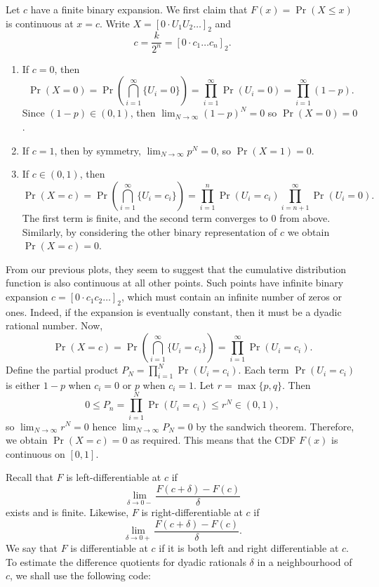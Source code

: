 \documentclass{article}
\begin{document}
Let \(c\) have a finite binary expansion. We first claim that \(F(x) = \Pr(X \leq x)\) is continuous at \(x = c\). Write \(X = [0 \cdot U_1 U_2\dots]_2\) and
\[ c = \frac{k}{2^n} = [0 \cdot c_1 \dots c_n]_2. \]
\begin{enumerate}
    \item If \(c = 0\), then 
    \[ \Pr(X = 0) = \Pr\left(\bigcap_{i=1}^\infty\{U_i = 0\}\right) = \prod_{i=1}^\infty \Pr(U_i = 0) = \prod_{i=1}^\infty (1 - p). \]
    Since \((1 - p) \in (0, 1)\), then \(\lim_{N \to \infty} (1 - p)^N = 0\) so \(\Pr(X = 0) = 0\).
    \item If \(c = 1\), then by symmetry, \(\lim_{N \to \infty} p^N = 0\), so \(\Pr(X = 1) = 0\).
    \item If \(c \in (0,1)\), then
    \[ \Pr(X = c) = \Pr\left(\bigcap_{i=1}^\infty\{U_i = c_i\}\right) = \prod_{i=1}^n \Pr(U_i = c_i)\prod_{i=n+1}^\infty \Pr(U_i = 0). \]
    The first term is finite, and the second term converges to \(0\) from above. Similarly, by considering the other binary representation of \(c\) we obtain \(\Pr(X = c) = 0\).
\end{enumerate}

From our previous plots, they seem to suggest that the cumulative distribution function is also continuous at all other points. Such points have infinite binary expansion \(c = [0 \cdot c_1c_2\dots]_2\), which must contain an infinite number of zeros or ones. Indeed, if the expansion is eventually constant, then it must be a dyadic rational number. Now,
\[ \Pr(X = c) = \Pr\left(\bigcap_{i=1}^\infty\{U_i = c_i\}\right) = \prod_{i=1}^\infty \Pr(U_i = c_i). \]
Define the partial product \(P_N = \prod_{i=1}^N \Pr(U_i = c_i) \). Each term \(\Pr(U_i = c_i)\) is either \(1 - p\) when \(c_i = 0\) or \(p\) when \(c_i = 1\). Let \(r = \max\{p,q\}\). Then
\[ 0 \leq P_n = \prod_{i=1}^N \Pr(U_i = c_i) \leq r^N \in (0,1), \]
so \(\lim_{N \to \infty} r^N = 0\) hence \(\lim_{N \to \infty} P_N = 0\) by the sandwich theorem. Therefore, we obtain \(\Pr(X = c) = 0\) as required. This means that the CDF \(F(x)\) is continuous on \([0,1]\).

Recall that \(F\) is left-differentiable at \(c\) if
\[ \lim_{\delta \to 0-} \frac{F(c + \delta) - F(c)}{\delta} \]
exists and is finite. Likewise, \(F\) is right-differentiable at \(c\) if
\[ \lim_{\delta \to 0+} \frac{F(c + \delta) - F(c)}{\delta}. \]
We say that \(F\) is differentiable at \(c\) if it is both left and right differentiable at \(c\). To estimate the difference quotients for dyadic rationals \(\delta\) in a neighbourhood of \(c\), we shall use the following code:
\end{document}
